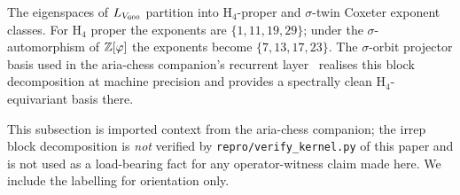 The eigenspaces of $L_{V_{600}}$ partition into H$_4$-proper and
$\sigma$-twin Coxeter exponent classes. For H$_4$ proper the
exponents are $\{1, 11, 19, 29\}$; under the
$\sigma$-automorphism of $\mathbb{Z}[\varphi]$ the exponents become
$\{7, 13, 17, 23\}$. The $\sigma$-orbit projector basis used in the
aria-chess companion's recurrent
layer~\citep{SmartAriaChess2026} realises this block decomposition
at machine precision and provides a spectrally clean
H$_4$-equivariant basis there.

This subsection is imported context from the aria-chess companion;
the irrep block decomposition is \emph{not} verified by
\texttt{repro/verify\_kernel.py} of this paper and is not used as
a load-bearing fact for any operator-witness claim made here. We
include the labelling for orientation only.
